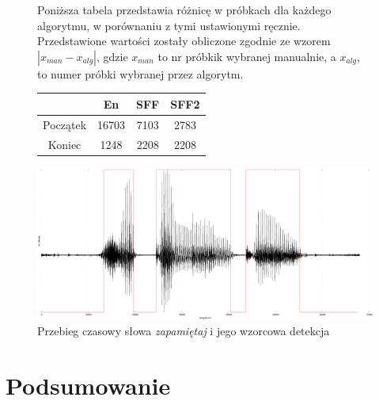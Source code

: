 \documentclass[eng,printmode]{mgr}
\begin{document}
\begin{figure}
	Poniższa tabela przedstawia różnicę w próbkach dla każdego algorytmu, w porównaniu z tymi ustawionymi ręcznie. Przedstawione wartości zostały obliczone zgodnie ze wzorem $| x_{man}-x_{alg} |$, gdzie $x_{man}$ to nr próbkik wybranej manualnie, a $x_{alg}$, to numer próbki wybranej przez algorytm. 
	\begin{center}
		\begin{tabular}{||c c c c||} 
			\hline
			& En & SFF & SFF2 \\ [0.5ex] 
			\hline\hline
			Początek & 16703 & 7103 & 2783 \\ 
			\hline
			Koniec & 1248 & 2208 & 2208 \\
			\hline
		\end{tabular}
	\end{center}
	
	\begin{center}
		\includegraphics[scale=0.2]{zapamietaj.png}
		\caption{Przebieg czasowy słowa \emph{zapamiętaj} i jego wzorcowa detekcja}\vspace{5mm}
	\end{center}
\end{figure}


\chapter{Podsumowanie}

%


 \listoffigures
 \listoftables
\end{document}
